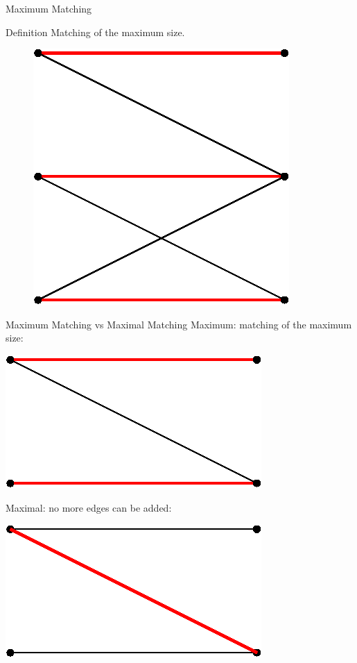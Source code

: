 \begin{frame}[t]{Maximum Matching}
	\begin{block}{Definition}
      Matching of the maximum size.
	\end{block} 
	
	\vspace{1em}
	\begin{figure}
		\centering
		\includegraphics[width=0.3\linewidth]{img/introduction/perfectmatching.eps}
	\end{figure}	
\end{frame}

\begin{frame}[t]{Maximum Matching vs Maximal Matching}
	Maximum: matching of the maximum size:
	\begin{center}
		\includegraphics[width=0.35\linewidth]{img/introduction/maximummatching.eps}
	\end{center}

	Maximal: no more edges can be added:
	\begin{center}
  	\includegraphics[width=0.35\linewidth]{img/introduction/maximalmatch.eps}
	\end{center}
\end{frame}
